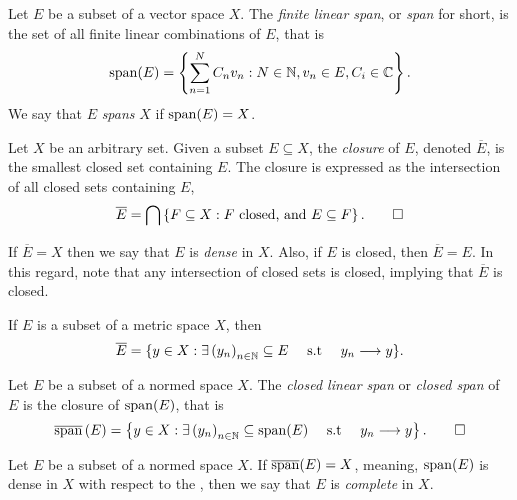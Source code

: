 \documentclass[../thesis.tex]{subfiles}
\begin{document}
\begin{definition}[Span]\label{def:span}  %
    Let $E$ be a subset of a vector space $X$. The \emph{finite linear span}, or \emph{span} for short, is the set of all finite linear combinations of $E$, that is
    \begin{equation*}
        \operatorname{span}(E)=\left\{\sum_{n=1}^N C_n v_n : N \in \mathbb{N}, v_n \in E, C_i \in \mathbb{C}\right\}.
    \end{equation*}
    We say that $E$ \emph{spans} $X$ if $\operatorname{span}(E) = X$.
\end{definition}

\begin{definition}[Closure]\label{def:closure}  %
    Let $X$ be an arbitrary set. Given a subset $E \subseteq X$, the \emph{closure} of $E$, denoted $\overline{E}$, is the smallest closed set containing $E$. The closure is expressed as the intersection of all closed sets containing $E$,
    \begin{equation*}
        \overline{E} = \bigcap \left\{F \subseteq X : F \text{ closed, and } E \subseteq F\right\}. \qedhere
    \end{equation*}
\end{definition}
If $\overline{E} = X$ then we say that $E$ is \emph{dense} in $X$. Also, if $E$ is closed, then $\overline{E}=E$. In this regard, note that any intersection of closed sets is closed, implying that $\overline{E}$ is closed.
\begin{remark} %
    If $E$ is a subset of a metric space $X$, then
    \begin{equation*} %
        \overline{E} = \{ y \in X : \exists \space \bracMed{y_n}_{n\in \N} \subseteq E \quad \text{ s.t }\quad y_n \longrightarrow y\}.
    \end{equation*}
\end{remark}

\begin{definition}\label{def:closed_span}  %
    Let $E$ be a subset of a normed space $X$. The \emph{closed linear span} or \emph{closed span} of $E$ is the closure of $\operatorname{span}(E)$, that is
    \begin{equation*}
        \overline{\operatorname{span}}\left(E\right) = \left\{y\in X: \exists \space \left(y_n\right)_{n\in \mathbb{N}} \subseteq \operatorname{span}(E) \quad \text{ s.t } \quad y_n \longrightarrow y\right\}. \qedhere
    \end{equation*}
\end{definition}

\begin{definition}[Complete]\label{def:complete}  %
    Let $E$ be a subset of a normed space $X$. If $\overline{\operatorname{span}}(E) = X$, meaning, $\operatorname{span}(E)$ is dense in $X$ with respect to the \GenNormX, then we say that $E$ is \emph{complete} in $X$.  %
\end{definition}
\end{document}
